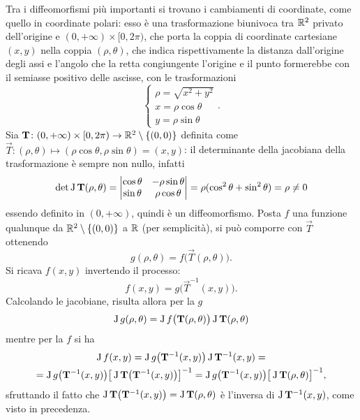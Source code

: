 \begin{esempio} \label{es:diffeomorfismo-coordinate-polari-R2}
	Tra i diffeomorfismi più importanti si trovano i cambiamenti di coordinate, come quello in coordinate polari: esso è una trasformazione biunivoca tra $\mathbb{R}^2$ privato dell'origine e $(0,+\infty)\times[0,2\pi)$, che porta la coppia di coordinate cartesiane $(x,y)$ nella coppia $(\rho,\theta)$, che indica rispettivamente la distanza dall'origine degli assi e l'angolo che la retta congiungente l'origine e il punto formerebbe con il semiasse positivo delle ascisse, con le trasformazioni
	\begin{equation}
	\begin{cases}
	\rho=\sqrt{x^2+y^2}\\
	x=\rho\cos\theta\\
	y=\rho\sin\theta
	\end{cases}.
	\end{equation}
	Sia $\mathbf{T}\colon(0,+\infty)\times[0,2\pi)\to\mathbb{R}^2\setminus\{(0,0)\}$ definita come $\vec T\colon(\rho,\theta)\mapsto(\rho\cos\theta,\rho\sin\theta)=(x,y)$: il determinante della jacobiana della trasformazione è sempre non nullo, infatti
	\[
	\det\operatorname{J}\mathbf{T}(\rho,\theta)=
		\begin{vmatrix}
		\cos\theta	&-\rho\sin\theta\\
		\sin\theta	&\rho\cos\theta
		\end{vmatrix}
	=\rho(\cos^2\theta+\sin^2\theta)=\rho\neq 0
	\]
	essendo definito in $(0,+\infty)$, quindi è un diffeomorfismo.
	Posta $f$ una funzione qualunque da $\mathbb{R}^2\setminus\{(0,0)\}$ a $\mathbb{R}$ (per semplicità), si può comporre con $\vec T$ ottenendo
	\[
	g(\rho,\theta)=f\big(\vec T(\rho,\theta)\big).
	\]
	Si ricava $f(x,y)$ invertendo il processo:
	\[
	f(x,y)=g\big(\vec T^{-1}(x,y)\big).
	\]
	Calcolando le jacobiane, risulta allora per la $g$
	\begin{equation} \label{eq:composizione_jacobiane_polari1}
	\operatorname{J} g(\rho,\theta)=\operatorname{J} f\big(\mathbf{T}(\rho,\theta)\big)\operatorname{J}\mathbf{T}(\rho,\theta)
	\end{equation}
	mentre per la $f$ si ha
	\begin{multline} \label{eq:composizione_jacobiane_polari2}
	\operatorname{J} f(x,y)=\operatorname{J} g\big(\mathbf{T}^{-1}(x,y)\big)\operatorname{J}\mathbf{T}^{-1}(x,y)=\\
	=\operatorname{J} g\big(\mathbf{T}^{-1}(x,y)\big)\big[\operatorname{J}\mathbf{T}\big(\mathbf{T}^{-1}(x,y)\big)\big]^{-1}=\operatorname{J} g\big(\mathbf{T}^{-1}(x,y)\big)\big[\operatorname{J}\mathbf{T}(\rho,\theta)\big]^{-1},
	\end{multline}
	sfruttando il fatto che $\operatorname{J}\mathbf{T}\big(\mathbf{T}^{-1}(x,y)\big)=\operatorname{J}\mathbf{T}(\rho,\theta)$ è l'inversa di $\operatorname{J}\mathbf{T}^{-1}(x,y)$, come visto in precedenza.


\end{esempio}
